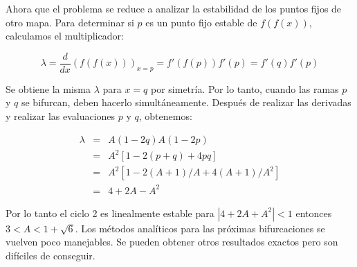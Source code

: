             Ahora que el problema se reduce a analizar la estabilidad de los puntos fijos de otro mapa. Para determinar si $p$ es un punto fijo estable de $f(f(x))$, calculamos el multiplicador:

            \begin{equation}
                \lambda = \frac{d}{dx} ( f( f(x) ) )_{x=p} = f'(f(p))f'(p) = f'(q)f'(p)
            \end{equation}

            Se obtiene la misma $\lambda$ para $x = q$ por simetría. Por lo tanto, cuando las ramas $p$ y $q$ se bifurcan, deben hacerlo simultáneamente. Después de realizar las derivadas y realizar las evaluaciones $p$ y $q$, obtenemos:

            \begin{eqnarray}
                \lambda & = & A(1-2q) A(1-2p)\\
                    & = & A^{2} [1 - 2(p+q) + 4 pq]\\
                    & = & A^{2} [1 - 2 (A+1)/A + 4(A+1)/A^{2}] \\
                    & = & 4 + 2 A - A^{2}
            \end{eqnarray}

            Por lo tanto el ciclo 2 es linealmente estable para $|4 + 2A + A^{2}| < 1$ entonces $3 < A < 1 + \sqrt{6}$. Los métodos analíticos para las próximas bifurcaciones se vuelven poco manejables. Se pueden obtener otros resultados exactos pero son difíciles de conseguir. 

